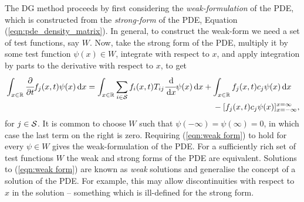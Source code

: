 The DG method proceeds by first considering the \textit{weak-formulation} of the PDE, which is constructed from the \textit{strong-form} of the PDE, Equation (\ref{eqn:pde_density_matrix}). In general, to construct the weak-form we need a set of test functions, say \(W\). Now, take the strong form of the PDE, multiply it by some test function \(\psi(x)\in W\), integrate with respect to \(x\), and apply integration by parts to the derivative with respect to \(x\), to get 
\begin{align}
\begin{multlined}[t]
	\int_{x\in\mathbb R}\cfrac{\partial}{\partial t} f_j(x,t)\psi(x)\wrt x = \int_{x\in\mathbb R} \sum_{i\in\calS}f_i(x,t)T_{ij}\cfrac{\wrt}{\wrt x}\psi(x)\wrt x 
	+  \int_{x\in\mathbb R} f_j(x,t)c_j\psi(x)\wrt x \\{}- [ f_j(x,t)c_j\psi(x)]_{x=-\infty}^{x=\infty}, \end{multlined}\label{eqn:weak form}
\end{align}
for \(j\in\mathcal{S}\). It is common to choose \(W\) such that \(\psi(-\infty)=\psi(\infty)=0\), in which case the last term on the right is zero. Requiring (\ref{eqn:weak form}) to hold for every \(\psi\in W\) gives the weak-formulation of the PDE. For a sufficiently rich set of test functions \(W\) the weak and strong forms of the PDE are equivalent. Solutions to (\ref{eqn:weak form}) are known as \textit{weak} solutions and generalise the concept of a solution of the PDE. For example, this may allow discontinuities with respect to \(x\) in the solution -- something which is ill-defined for the strong form.

